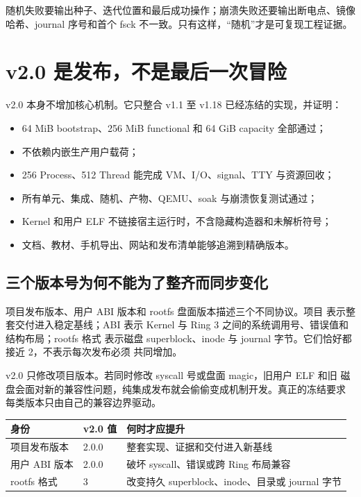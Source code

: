 随机失败要输出种子、迭代位置和最后成功操作；崩溃失败还要输出断电点、镜像
哈希、journal 序号和首个 fsck 不一致。只有这样，“随机”才是可复现工程证据。

\section{v2.0 是发布，不是最后一次冒险}

v2.0 本身不增加核心机制。它只整合 v1.1 至 v1.18 已经冻结的实现，并证明：

\begin{itemize}
  \item 64 MiB bootstrap、256 MiB functional 和 64 GiB capacity 全部通过；
  \item {} 不依赖内嵌生产用户载荷；
  \item 256 Process、512 Thread 能完成 VM、I/O、signal、TTY 与资源回收；
  \item 所有单元、集成、随机、产物、QEMU、soak 与崩溃恢复测试通过；
  \item Kernel 和用户 ELF 不链接宿主运行时，不含隐藏构造器和未解析符号；
  \item 文档、教材、手机导出、网站和发布清单能够追溯到精确版本。
\end{itemize}

\subsection{三个版本号为何不能为了整齐而同步变化}

项目发布版本、用户 ABI 版本和 rootfs 盘面版本描述三个不同协议。项目
 表示整套交付进入稳定基线；ABI  表示 Kernel 与
Ring 3 之间的系统调用号、错误值和结构布局；rootfs 格式  表示磁盘
superblock、inode 与 journal 字节。它们恰好都接近 2，不表示每次发布必须
共同增加。

v2.0 只修改项目版本。若同时修改 syscall 号或盘面 magic，旧用户 ELF 和旧
磁盘会面对新的兼容性问题，纯集成发布就会偷偷变成机制开发。真正的冻结要求
每类版本只由自己的兼容边界驱动。

\begin{longtable}{L{0.22\textwidth}L{0.18\textwidth}L{0.43\textwidth}}
\toprule
\textbf{身份} & \textbf{v2.0 值} & \textbf{何时才应提升}\\
\midrule
项目发布版本 & 2.0.0 & 整套实现、证据和交付进入新基线\\
用户 ABI 版本 & 2.0.0 & 破坏 syscall、错误或跨 Ring 布局兼容\\
rootfs 格式 & 3 & 改变持久 superblock、inode、目录或 journal 字节\\
\bottomrule
\end{longtable}

